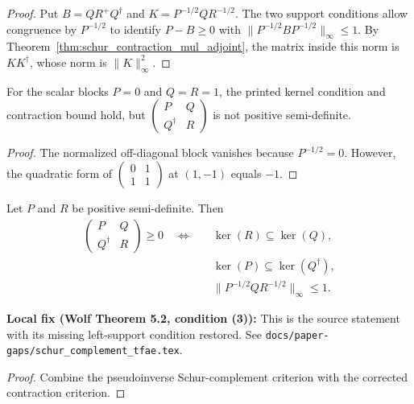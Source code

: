 \begin{proof}\leanok
  Put $B=QR^+Q^\dagger$ and $K=P^{-1/2}QR^{-1/2}$. The two support conditions
  allow congruence by $P^{-1/2}$ to identify $P-B\ge0$ with
  $\lVert P^{-1/2}BP^{-1/2}\rVert_\infty\le1$. By
  Theorem~\ref{thm:schur_contraction_mul_adjoint}, the matrix inside this norm
  is $KK^\dagger$, whose norm is $\lVert K\rVert_\infty^2$.
\end{proof}

\begin{theorem}
  \label{thm:wolf_schur_condition_three_counterexample}
  \leanok
  For the scalar blocks $P=0$ and $Q=R=1$, the printed kernel condition and
  contraction bound hold, but
  $\begin{pmatrix}P&Q\\Q^\dagger&R\end{pmatrix}$ is not positive
  semi-definite.
\end{theorem}

\begin{proof}\leanok
  The normalized off-diagonal block vanishes because $P^{-1/2}=0$. However,
  the quadratic form of $\begin{pmatrix}0&1\\1&1\end{pmatrix}$ at $(1,-1)$
  equals $-1$.
\end{proof}

\begin{theorem}
  \label{thm:block_psd_iff_corrected_contraction}
  \leanok
  Let $P$ and $R$ be positive semi-definite. Then
  \begin{align}
    \begin{pmatrix}P&Q\\Q^\dagger&R\end{pmatrix}\ge0
    \quad\Longleftrightarrow\quad
    &\ker(R)\subseteq\ker(Q),\\
    &\ker(P)\subseteq\ker(Q^\dagger),\\
    &\lVert P^{-1/2}QR^{-1/2}\rVert_\infty\le1.
  \end{align}

  \textbf{Local fix (Wolf Theorem 5.2, condition (3)):}
  This is the source statement with its missing left-support condition restored.
  See \texttt{docs/paper-gaps/schur\_complement\_tfae.tex}.
\end{theorem}

\begin{proof}\leanok
  Combine the pseudoinverse Schur-complement criterion with the corrected
  contraction criterion.
\end{proof}
